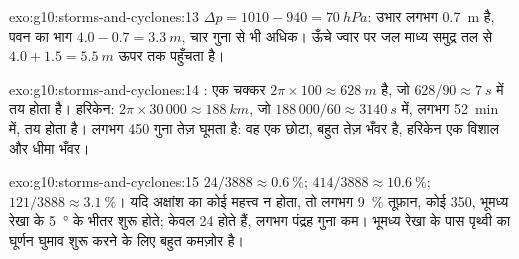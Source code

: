 \begin{solution}{exo:g10:storms-and-cyclones:13}
$\Delta p = 1010 - 940 = \qty{70}{hPa}$: उभार लगभग \qty{0.7}{m} है,
पवन का भाग $4.0 - 0.7 = \qty{3.3}{m}$, चार गुना से भी अधिक। ऊँचे
ज्वार पर जल माध्य समुद्र तल से $4.0 + 1.5 = \qty{5.5}{m}$ ऊपर तक पहुँचता है।
\end{solution}

\begin{solution}{exo:g10:storms-and-cyclones:14}
: एक चक्कर $2\pi \times 100 \approx \qty{628}{m}$ है, जो
$628/90 \approx \qty{7}{s}$ में तय होता है। हरिकेन: $2\pi \times 30\,000 \approx
\qty{188}{km}$, जो $188\,000/60 \approx \qty{3140}{s}$ में, लगभग
\qty{52}{min} में, तय होता है।  लगभग 450 गुना तेज़ घूमता है: वह एक छोटा, बहुत
तेज़ भँवर है, हरिकेन एक विशाल और धीमा भँवर।
\end{solution}

\begin{solution}{exo:g10:storms-and-cyclones:15}
$24/3888 \approx \qty{0.6}{\percent}$; $414/3888 \approx
\qty{10.6}{\percent}$; $121/3888 \approx \qty{3.1}{\percent}$। यदि अक्षांश का
कोई महत्त्व न होता, तो लगभग \qty{9}{\percent} तूफ़ान, कोई 350, भूमध्य रेखा के
\qty{5}{\degree} के भीतर शुरू होते; केवल 24 होते हैं, लगभग पंद्रह गुना
कम। भूमध्य रेखा के पास पृथ्वी का घूर्णन घुमाव शुरू करने के लिए बहुत कमज़ोर है।
\end{solution}

